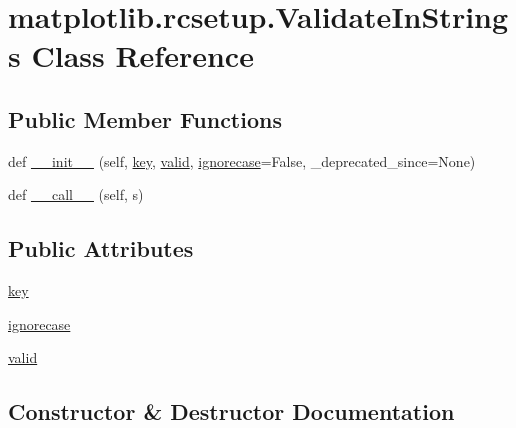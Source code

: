 \hypertarget{classmatplotlib_1_1rcsetup_1_1ValidateInStrings}{}\section{matplotlib.\+rcsetup.\+Validate\+In\+Strings Class Reference}
\label{classmatplotlib_1_1rcsetup_1_1ValidateInStrings}
\subsection*{Public Member Functions}
\begin{DoxyCompactItemize}
\item 
def \hyperlink{classmatplotlib_1_1rcsetup_1_1ValidateInStrings_ae450c439dd04de59946e5ffa97e32db9}{\+\_\+\+\_\+init\+\_\+\+\_\+} (self, \hyperlink{classmatplotlib_1_1rcsetup_1_1ValidateInStrings_ae78cdb6e6a771d386c0bfefb30bb9551}{key}, \hyperlink{classmatplotlib_1_1rcsetup_1_1ValidateInStrings_a30d26e18fbb2c0daf0785eb9531ceaf8}{valid}, \hyperlink{classmatplotlib_1_1rcsetup_1_1ValidateInStrings_a3a1497f563362af7b16307af7987445a}{ignorecase}=False, \+\_\+deprecated\+\_\+since=None)
\item 
def \hyperlink{classmatplotlib_1_1rcsetup_1_1ValidateInStrings_af5df15ff7c9a55e099aa38f1811486d6}{\+\_\+\+\_\+call\+\_\+\+\_\+} (self, s)
\end{DoxyCompactItemize}
\subsection*{Public Attributes}
\begin{DoxyCompactItemize}
\item 
\hyperlink{classmatplotlib_1_1rcsetup_1_1ValidateInStrings_ae78cdb6e6a771d386c0bfefb30bb9551}{key}
\item 
\hyperlink{classmatplotlib_1_1rcsetup_1_1ValidateInStrings_a3a1497f563362af7b16307af7987445a}{ignorecase}
\item 
\hyperlink{classmatplotlib_1_1rcsetup_1_1ValidateInStrings_a30d26e18fbb2c0daf0785eb9531ceaf8}{valid}
\end{DoxyCompactItemize}


\subsection{Constructor \& Destructor Documentation}
\mbox{\label{classmatplotlib_1_1rcsetup_1_1ValidateInStrings_ae450c439dd04de59946e5ffa97e32db9}} 
